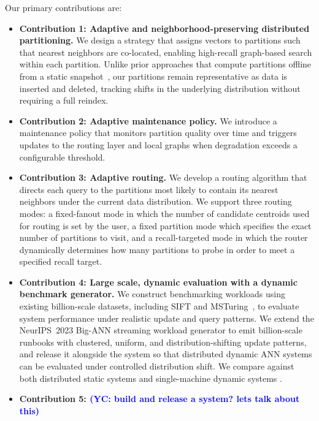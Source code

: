 \documentclass[sigconf,review,anonymous]{acmart}
\newcommand{\yc}[1]{\textcolor{blue}{(YC: #1)}}
\begin{document}
Our primary contributions are:
\begin{itemize}
    \item {\bf Contribution 1: Adaptive and neighborhood-preserving distributed partitioning.} We design a strategy that assigns vectors to partitions such that nearest neighbors are co-located, enabling high-recall graph-based search within each partition. Unlike prior approaches that compute partitions offline from a static snapshot~\cite{gottensuren2025unleashing, deng2019pyramid, chen2021spann}, our partitions remain representative as data is inserted and deleted, tracking shifts in the underlying distribution without requiring a full reindex.

    \item {\bf Contribution 2: Adaptive maintenance policy.} We introduce a maintenance policy that monitors partition quality over time and triggers updates to the routing layer and local graphs when degradation exceeds a configurable threshold.

    \item {\bf Contribution 3: Adaptive routing.} We develop a routing algorithm that directs each query to the partitions most likely to contain its nearest neighbors under the current data distribution. We support three routing modes: a fixed-fanout mode in which the number of candidate centroids used for routing is set by the user, a fixed partition mode which specifies the exact number of partitions to visit, and a recall-targeted mode in which the router dynamically determines how many partitions to probe in order to meet a specified recall target.

    \item {\bf Contribution 4: Large scale, dynamic evaluation with a dynamic benchmark generator.} We construct benchmarking workloads using existing billion-scale datasets, including SIFT and MSTuring~\cite{simhadri2022results, simhadri2024results}, to evaluate system performance under realistic update and query patterns. We extend the NeurIPS~2023 Big-ANN streaming workload generator to emit billion-scale runbooks with clustered, uniform, and distribution-shifting update patterns, and release it alongside the system so that distributed dynamic ANN systems can be evaluated under controlled distribution shift. We compare against both distributed static systems and single-machine dynamic systems .

    \item {\bf Contribution 5: \yc{build and release a system? lets talk about this} }
\end{itemize}
\end{document}
